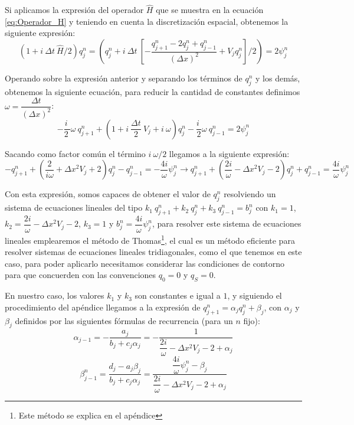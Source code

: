 \documentclass[10pt,onecolumn]{article}
\begin{document}
Si aplicamos la expresión del operador $\hat{H}$ que se muestra en la ecuación \ref{eq:Operador_H} y teniendo en cuenta la discretización espacial, obtenemos la siguiente expresión:
\begin{equation}
    (1+i\ \Delta t\ \hat{H}/2)q^n_j = (q_j^n+i\ \Delta t\ [-\dfrac{q_{j+1}^{n} - 2q_{j}^{n} + q_{j-1}^{n}}{(\Delta x)^2} + V_{j} q_{j}^{n}]/2) = 2\psi^n_j
\end{equation}


Operando sobre la expresión anterior y separando los términos de $q^n_j$ y los demás, obtenemos la siguiente ecuación, para reducir la cantidad de constantes definimos $\omega = \dfrac{\Delta t}{(\Delta x)^2}$:
\begin{equation}
    -\dfrac{i\ }{2\ }\omega\ q_{j+1}^{n} + (1 + i\ \dfrac{\Delta t}{2}\ V_j + i\ \omega) q_{j}^{n} - \dfrac{i\ }{2 }\omega\  q_{j-1}^{n} = 2\psi^n_j
\end{equation}

Sacando como factor común el término $i\ \omega/2$ llegamos a la siguiente expresión:
\begin{equation}
    -q_{j+1}^{n} + (\dfrac{2}{i \omega} +\Delta x^2 V_j + 2) q_{j}^{n} - q_{j-1}^{n} = - \dfrac{4i}{\omega}\psi^n_j \rightarrow q_{j+1}^{n} + (\dfrac{2i}{\omega} -\Delta x^2 V_j - 2) q_{j}^{n} + q_{j-1}^{n} = \dfrac{4i}{\omega}\psi^n_j
\end{equation}

Con esta expresión, somos capaces de obtener el valor de $q^n_j$ resolviendo un sistema de ecuaciones lineales del tipo $k_1\ q_{j+1}^{n} + k_2\ q_{j}^{n} + k_3\ q_{j-1}^{n} = b_j^n$ con $k_1 = 1$, $k_2 = \dfrac{2i}{\omega} -\Delta x^2 V_j - 2$, $k_3 = 1$ y $b_j^n = \dfrac{4i}{\omega}\psi^n_j$, para resolver este sistema de ecuaciones lineales emplearemos el método de Thomas\footnote{Este método se explica en el apéndice}, el cual es un método eficiente para resolver sistemas de ecuaciones lineales tridiagonales, como el que tenemos en este caso, para poder aplicarlo necesitamos considerar las condiciones de contorno para que concuerden con las convenciones $q_0 = 0$ y $q_S = 0$.

En nuestro caso, los valores $k_1$ y $k_3$ son constantes e igual a $1$, y siguiendo el procedimiento del apéndice llegamos a la expresión de $q^n_{j+1} = \alpha_j q^n_j + \beta_j$, con $\alpha_j$ y $\beta_j$ definidos por las siguientes fórmulas de recurrencia (para un $n$ fijo):
\begin{equation}
    \alpha_{j-1} = -\dfrac{a_j}{b_j + c_j \alpha_j} = -\dfrac{1}{\dfrac{2i}{\omega} -\Delta x^2 V_j - 2 + \alpha_j}
\end{equation}
\begin{equation}        
    \beta_{j-1}^n = \dfrac{d_j - a_j \beta_{j}}{b_j + c_j \alpha_j} = \dfrac{\dfrac{4i}{\omega}\psi^n_j - \beta_{j}}{\dfrac{2i}{\omega} -\Delta x^2 V_j - 2 + \alpha_j}
\end{equation}
\end{document}

